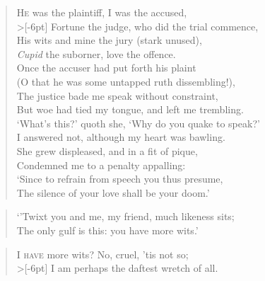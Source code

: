 \documentclass[a5paper, 12pt, oneside]{memoir}
\begin{document}
\PoemTitle{}
\begin{verse}
    \lettrine{H}{e} was the plaintiff, I was the accused, \\>[-6pt]
    Fortune the judge, who did the trial commence, \\
    His wits and mine the jury (stark unused), \\
    \textit{Cupid} the suborner, love the offence. \\
    Once the accuser had put forth his plaint \\
    (O that he was some untapped ruth dissembling!), \\
    The justice bade me speak without constraint, \\
    But woe had tied my tongue, and left me trembling. \\
    `What's this?' quoth she, `Why do you quake to speak?' \\
    I answered not, although my heart was bawling. \\
    She grew displeased, and in a fit of pique, \\
    Condemned me to a penalty appalling: \\
    \vin `Since to refrain from speech you thus presume, \\
    \vin The silence of your love shall be your doom.'
\end{verse}

\PoemTitle{}
\begin{verse}
    \vin `'Twixt you and me, my friend, much likeness sits; \\
    \vin The only gulf is this: you have more wits.'
\end{verse}

\PoemTitle{}
\begin{verse}
    \lettrine{I}{ have} more wits? No, cruel, 'tis not so; \\>[-6pt]
    I am perhaps the daftest wretch of all. \\
\end{verse}
\end{document}

